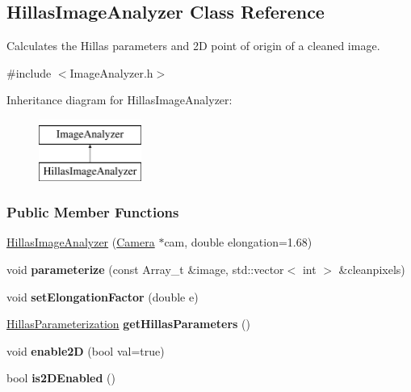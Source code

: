 \hypertarget{classHillasImageAnalyzer}{
\subsection{HillasImageAnalyzer Class Reference}
\label{classHillasImageAnalyzer}
}


Calculates the Hillas parameters and 2D point of origin of a cleaned image.  




{\ttfamily \#include $<$ImageAnalyzer.h$>$}

Inheritance diagram for HillasImageAnalyzer:\begin{figure}[H]
\begin{center}
\leavevmode
\includegraphics[height=2.000000cm]{classHillasImageAnalyzer}
\end{center}
\end{figure}
\subsubsection*{Public Member Functions}
\begin{DoxyCompactItemize}
\item 
\hyperlink{classHillasImageAnalyzer_aea4e48e8d339197bee6779f342578c1e}{HillasImageAnalyzer} (\hyperlink{classCamera}{Camera} $\ast$cam, double elongation=1.68)
\item 
\hypertarget{classHillasImageAnalyzer_a9b40029788b2d4c8420bc717a684351b}{
void {\bfseries parameterize} (const Array\_\-t \&image, std::vector$<$ int $>$ \&cleanpixels)}
\label{classHillasImageAnalyzer_a9b40029788b2d4c8420bc717a684351b}

\item 
\hypertarget{classHillasImageAnalyzer_a550511668d93263f330835b91ed9736e}{
void {\bfseries setElongationFactor} (double e)}
\label{classHillasImageAnalyzer_a550511668d93263f330835b91ed9736e}

\item 
\hypertarget{classHillasImageAnalyzer_ab9c2f4930a02e6d13d73a136031a97e2}{
\hyperlink{structHillasParameterization}{HillasParameterization} {\bfseries getHillasParameters} ()}
\label{classHillasImageAnalyzer_ab9c2f4930a02e6d13d73a136031a97e2}

\item 
\hypertarget{classHillasImageAnalyzer_a02a2a87a5aedb07989f29a9f2937d59a}{
void {\bfseries enable2D} (bool val=true)}
\label{classHillasImageAnalyzer_a02a2a87a5aedb07989f29a9f2937d59a}

\item 
\hypertarget{classHillasImageAnalyzer_abbc677e62927a5a870b03182d61eb025}{
bool {\bfseries is2DEnabled} ()}
\label{classHillasImageAnalyzer_abbc677e62927a5a870b03182d61eb025}

\end{DoxyCompactItemize}


